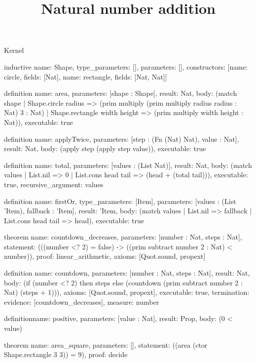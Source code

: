 \begin{lexlean}{Kernel}
\title{Natural number addition}
\begin{semanticmodule}
inductive{
  name: Shape,
  type_parameters: [],
  parameters: [],
  constructors: [{name: circle, fields: [Nat]}, {name: rectangle, fields: [Nat, Nat]}]
}

definition{
  name: area,
  parameters: [shape : Shape],
  result: Nat,
  body: (match shape
    | Shape.circle radius => (prim multiply (prim multiply radius radius : Nat) 3 : Nat)
    | Shape.rectangle width height => (prim multiply width height : Nat)),
  executable: true
}

definition{
  name: applyTwice,
  parameters: [step : (Fn (Nat) Nat), value : Nat],
  result: Nat,
  body: (apply step (apply step value)),
  executable: true
}

definition{
  name: total,
  parameters: [values : (List Nat)],
  result: Nat,
  body: (match values | List.nil => 0 | List.cons head tail => (head + (total tail))),
  executable: true,
  recursive_argument: values
}

definition{
  name: firstOr,
  type_parameters: [Item],
  parameters: [values : (List 'Item), fallback : 'Item],
  result: 'Item,
  body: (match values | List.nil => fallback | List.cons head tail => head),
  executable: true
}

theorem{
  name: countdown_decreases,
  parameters: [number : Nat, steps : Nat],
  statement: (((number <? 2) = false) -> ((prim subtract number 2 : Nat) < number)),
  proof: linear_arithmetic{},
  axioms: [Quot.sound, propext]
}

definition{
  name: countdown,
  parameters: [number : Nat, steps : Nat],
  result: Nat,
  body: (if (number <? 2) then steps else (countdown (prim subtract number 2 : Nat) (steps + 1))),
  axioms: [Quot.sound, propext],
  executable: true,
  termination: {evidence: [countdown_decreases], measure: number}
}

definition{name: positive, parameters: [value : Nat], result: Prop, body: (0 < value)}

theorem{
  name: area_square,
  parameters: [],
  statement: ((area (ctor Shape.rectangle 3 3)) = 9),
  proof: decide{}
}
\end{semanticmodule}
\end{lexlean}
